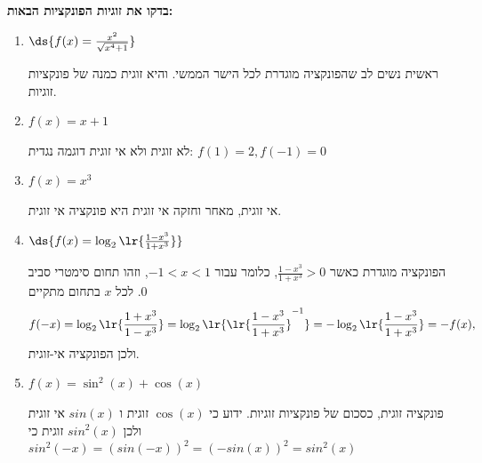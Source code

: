 \textbf{בדקו את זוגיות הפונקציות הבאות:}
\begin{enumerate}
\item  $\ds{f(x)=\frac{x^2}{\sqrt{x^4+1}}}$
\begin{solbox}
ראשית נשים לב שהפונקציה מוגדרת לכל הישר הממשי. והיא זוגית כמנה של פונקציות זוגיות.
\end{solbox}
\item  $f(x)=x+1$
\begin{solbox}
לא זוגית ולא אי זוגית דוגמה נגדית:
$f(1)=2 , f(-1)=0$
\end{solbox}
\item  $f(x)=x^3$
\begin{solbox}
אי זוגית,
מאחר וחזקה אי זוגית היא פונקציה אי זוגית.
\end{solbox}
\item  $\ds{f(x)=\log_2\lr{\frac{1-x^3}{1+x^3}}}$
\begin{solbox}
הפונקציה מוגדרת כאשר
$\frac{1-x^3}{1+x^3}>0$,
כלומר עבור
$-1<x<1$,
וזהו תחום סימטרי סביב $0$.
לכל $x$ בתחום מתקיים
$$f(-x)=\log_2\lr{\frac{1+x^3}{1-x^3}}=\log_2\lr{\lr{\frac{1-x^3}{1+x^3}}^{-1}}=-\log_2\lr{\frac{1-x^3}{1+x^3}}=-f(x),$$
ולכן הפונקציה אי-זוגית.
\end{solbox}
\item $f(x)=\sin^2(x)+\cos(x)$
\begin{solbox}
פונקציה זוגית,
כסכום של פונקציות זוגיות.
ידוע כי
$\cos(x)$
זוגית
ו
$sin(x)$
אי זוגית ולכן
$sin^2(x)$
זוגית
כי
\\
$sin^2(-x)=(sin(-x))^2=(-sin(x))^2=sin^2(x)$
\end{solbox}
\eMs
\end{enumerate}
